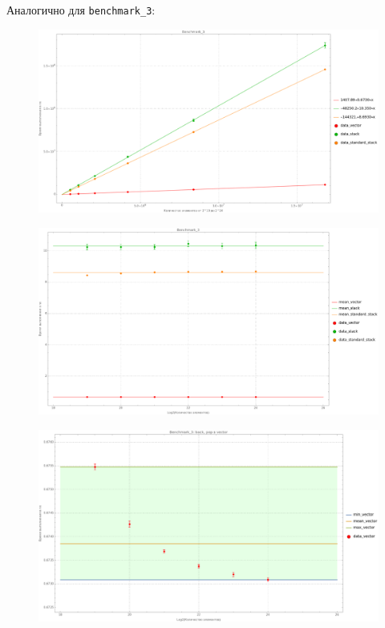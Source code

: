 Аналогично для \texttt{benchmark_3}:
\begin{figure}[H]
  \centering
  \includegraphics[width=1.0\textwidth]{../../resources/benchmark_3_1.png}
  \caption{}
\end{figure}
\begin{figure}[H]
  \centering
  \includegraphics[width=1.0\textwidth]{../../resources/benchmark_3_2.png}
  \caption{}
\end{figure}
\begin{figure}[H]
  \centering
  \includegraphics[width=1.0\textwidth]{../../resources/benchmark_3_3.png}
  \caption{}
\end{figure}
